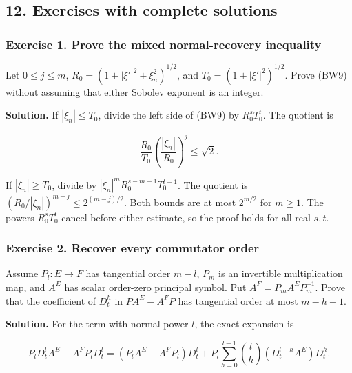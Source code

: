 \documentclass[
  11pt,
]{article}
\makeatletter
\let\ReaderOriginalAnchorStart\hyper@anchorstart
\let\ReaderOriginalAnchorEnd\hyper@anchorend
\let\ReaderPendingAliases\@empty
\def\ReaderArmAliases#1{\gdef\ReaderPendingAliases{#1}}
\def\hyper@anchorstart#1{\ReaderIfNativeAnchorTF{#1}{\ReaderPendingAliases\global\let\ReaderPendingAliases\@empty}{}\ReaderOriginalAnchorStart{#1}}
\makeatother
\begin{document}
\ReaderArmAliases{\ReaderOriginalAnchorStart{AN03-BWF-012}\ReaderOriginalAnchorEnd\begingroup\expandafter\def\csname @currentHref\endcsname{AN03-BWF-012}\label{AN03-BWF-012}\endgroup\ReaderOriginalAnchorStart{12-exercises-with-complete-solutions}\ReaderOriginalAnchorEnd\begingroup\expandafter\def\csname @currentHref\endcsname{12-exercises-with-complete-solutions}\label{12-exercises-with-complete-solutions}\endgroup}
\subsection{12. Exercises with complete
solutions}\label{exercises-with-complete-solutions}

\subsubsection{Exercise 1. Prove the mixed normal-recovery
inequality}\label{exercise-1.-prove-the-mixed-normal-recovery-inequality}

Let \(0\leq j\leq m\), \(R_0=(1+|\xi'|^2+\xi_n^2)^{1/2}\), and
\(T_0=(1+|\xi'|^2)^{1/2}\). Prove (BW9) without assuming that either
Sobolev exponent is an integer.

\textbf{Solution.} If \(|\xi_n|\leq T_0\), divide the left side of (BW9)
by \(R_0^sT_0^t\). The quotient is

\[
 \frac{R_0}{T_0}\left(\frac{|\xi_n|}{R_0}\right)^j
 \leq \sqrt2.
 \tag{BW49}
\]

If \(|\xi_n|\geq T_0\), divide by \(|\xi_n|^mR_0^{s-m+1}T_0^{t-1}\). The
quotient is \((R_0/|\xi_n|)^{m-j}\leq2^{(m-j)/2}\). Both bounds are at
most \(2^{m/2}\) for \(m\geq1\). The powers \(R_0^sT_0^t\) cancel before
either estimate, so the proof holds for all real \(s,t\).

\subsubsection{Exercise 2. Recover every commutator
order}\label{exercise-2.-recover-every-commutator-order}

Assume \(P_l:E\to F\) has tangential order \(m-l\), \(P_m\) is an
invertible multiplication map, and \(A^E\) has scalar order-zero
principal symbol. Put \(A^F=P_mA^EP_m^{-1}\). Prove that the coefficient
of \(D_t^h\) in \(PA^E-A^FP\) has tangential order at most \(m-h-1\).

\textbf{Solution.} For the term with normal power \(l\), the exact
expansion is

\[
 P_lD_t^lA^E-A^FP_lD_t^l
 =(P_lA^E-A^FP_l)D_t^l
 +P_l\sum_{h=0}^{l-1}\binom lh(D_t^{l-h}A^E)D_t^h.
 \tag{BW50}
\]
\end{document}
